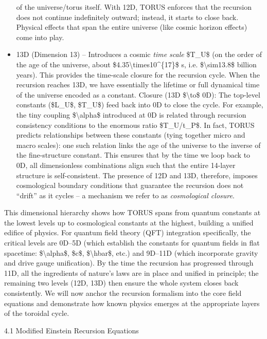 \documentclass[]{article}
\begin{document}
\begin{itemize}
  of the universe/torus itself. With 12D, TORUS enforces that the
  recursion does not continue indefinitely outward; instead, it starts
  to close back. Physical effects that span the entire universe (like
  cosmic horizon effects) come into play.
\item
  13D (Dimension 13) -- Introduces a cosmic \emph{time scale} \$T\_U\$
  (on the order of the age of the universe, about
  \$4.35\textbackslash{}times10\^{}\{17\}\$ s, i.e.
  \$\textbackslash{}sim13.8\$ billion years). This provides the
  time-scale closure for the recursion cycle. When the recursion reaches
  13D, we have essentially the lifetime or full dynamical time of the
  universe encoded as a constant. Closure (13D \$\textbackslash{}to\$
  0D): The top-level constants (\$L\_U\$, \$T\_U\$) feed back into 0D to
  close the cycle. For example, the tiny coupling
  \$\textbackslash{}alpha\$ introduced at 0D is related through
  recursion consistency conditions to the enormous ratio \$T\_U/t\_P\$.
  In fact, TORUS predicts relationships between these constants (tying
  together micro and macro scales): one such relation links the age of
  the universe to the inverse of the fine-structure constant. This
  ensures that by the time we loop back to 0D, all dimensionless
  combinations align such that the entire 14-layer structure is
  self-consistent. The presence of 12D and 13D, therefore, imposes
  cosmological boundary conditions that guarantee the recursion does not
  ``drift'' as it cycles -- a mechanism we refer to as
  \emph{cosmological closure}.
\end{itemize}

This dimensional hierarchy shows how TORUS spans from quantum constants
at the lowest levels up to cosmological constants at the highest,
building a unified edifice of physics. For quantum field theory (QFT)
integration specifically, the critical levels are 0D--5D (which
establish the constants for quantum fields in flat spacetime:
\$\textbackslash{}alpha\$, \$c\$, \$\textbackslash{}hbar\$, etc.) and
9D--11D (which incorporate gravity and drive gauge unification). By the
time the recursion has progressed through 11D, all the ingredients of
nature's laws are in place and unified in principle; the remaining two
levels (12D, 13D) then ensure the whole system closes back consistently.
We will now anchor the recursion formalism into the core field equations
and demonstrate how known physics emerges at the appropriate layers of
the toroidal cycle.

4.1 Modified Einstein Recursion Equations
\end{document}
